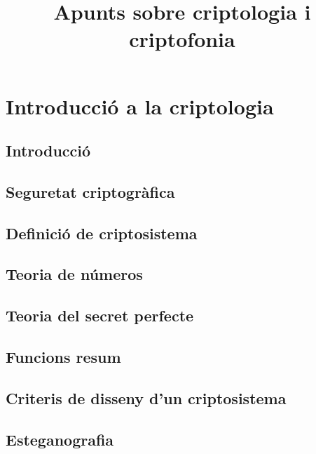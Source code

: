 \documentclass[a4paper]{article}
\begin{document}
\title{Apunts sobre criptologia i criptofonia}
\maketitle

\begin{comment}
oddsidemargin \the\oddsidemargin \newline
textwidth \the\textwidth \newline
marginparsep \the\marginparsep \newline
marginparwidth \the\marginparwidth \newline
hoffset \the\hoffset \newline
paperwidth \the\paperwidth 
\end{comment}

\section{Introducció a la criptologia}
	\subsection{Introducció}
	\subsection{Seguretat criptogràfica}
	\subsection{Definició de criptosistema}
	\subsection{Teoria de números}
	\subsection{Teoria del secret perfecte}
	\subsection{Funcions resum}
	\subsection{Criteris de disseny d’un criptosistema}
	\subsection{Esteganografia}
\end{document}
